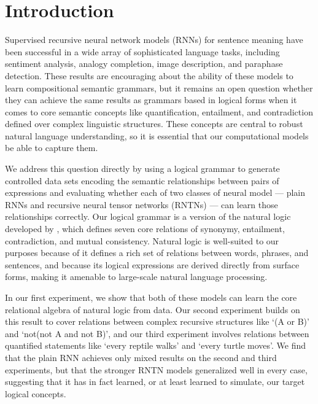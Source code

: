 \section{Introduction}\label{sec:intro}

Supervised recursive neural network models (RNNs) for sentence meaning
have been successful in a wide array of sophisticated language tasks,
including sentiment analysis, analogy completion, image description,
and paraphase detection. These results are encouraging about the
ability of these models to learn compositional semantic grammars, but
it remains an open question whether they can achieve the same results
as grammars based in logical forms when it comes to core semantic
concepts like quantification, entailment, and contradiction defined
over complex linguistic structures. These concepts are central to
robust natural language understanding, so it is essential that our
computational models be able to capture them.

We address this question directly by using a logical grammar to
generate controlled data sets encoding the semantic relationships
between pairs of expressions and evaluating whether each of two
classes of neural model --- plain RNNs and recursive neural tensor
networks (RNTNs) --- can learn those relationships correctly. Our
logical grammar is a version of the natural logic developed by
\cite{maccartney2009extended}, which defines seven core relations of
synonymy, entailment, contradiction, and mutual consistency. Natural
logic is well-suited to our purposes because of it defines a rich set
of relations between words, phrases, and sentences, and because its
logical expressions are derived directly from surface forms, making it
amenable to large-scale natural language processing.

In our first experiment, we show that both of these models can learn
the core relational algebra of natural logic from data. Our second
experiment builds on this result to cover relations between complex
recursive structures like `(A or B)' and `not(not A and not B)', and
our third experiment involves relations between quantified statements
like `every reptile walks' and `every turtle moves'. We find that the
plain RNN achieves only mixed results on the second and third
experiments, but that the stronger RNTN models generalized well in
every case, suggesting that it has in fact learned, or at least
learned to simulate, our target logical concepts. %

